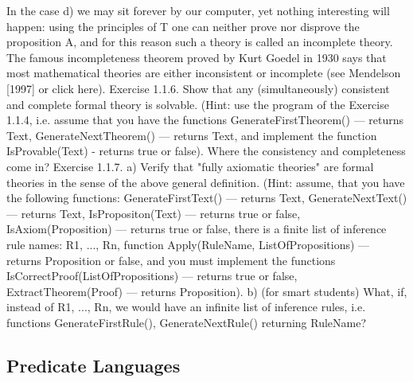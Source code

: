 In the case d) we may sit forever by our computer, yet nothing interesting will happen: using the
principles of T one can neither prove nor disprove the proposition A, and for this reason such a theory is
called an incomplete theory. The famous incompleteness theorem proved by Kurt Goedel in 1930 says
that most mathematical theories are either inconsistent or incomplete (see Mendelson [1997] or click
here).
Exercise 1.1.6. Show that any (simultaneously) consistent and complete formal theory is solvable. (Hint:
use the program of the Exercise 1.1.4, i.e. assume that you have the functions GenerateFirstTheorem() ---
returns Text, GenerateNextTheorem() --- returns Text, and implement the function IsProvable(Text) -
returns true or false). Where the consistency and completeness come in?
Exercise 1.1.7. a) Verify that "fully axiomatic theories" are formal theories in the sense of the above
general definition. (Hint: assume, that you have the following functions: GenerateFirstText() --- returns
Text, GenerateNextText() --- returns Text, IsPropositon(Text) --- returns true or false, IsAxiom(Proposition) ---
returns true or false, there is a finite list of inference rule names: {R1, ..., Rn}, function Apply(RuleName,
ListOfPropositions) --- returns Proposition or false, and you must implement the functions
IsCorrectProof(ListOfPropositions) --- returns true or false, ExtractTheorem(Proof) --- returns Proposition).
b) (for smart students) What, if, instead of {R1, ..., Rn}, we would have an infinite list of inference rules,
i.e. functions GenerateFirstRule(), GenerateNextRule() returning RuleName?

\subsection{Predicate Languages}

